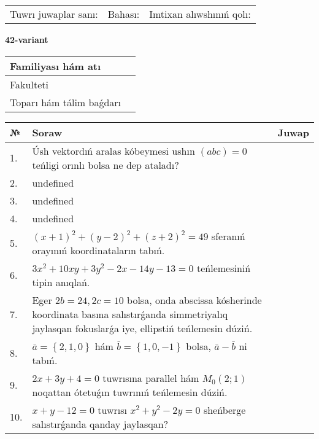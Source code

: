 \documentclass{article}
\begin{document}
\vspace{0.7cm}

\begin{tabular}{lll}
Tuwrı juwaplar sanı: \underline{\hspace{1cm}} & 
Bahası: \underline{\hspace{1cm}} & 
Imtixan alıwshınıń qolı: \underline{\hspace{2cm}} \\
\end{tabular}

\egroup

\newpage


\textbf{42-variant}\\

\bgroup
\def\arraystretch{1.6} %

\begin{tabular}{|m{5.7cm}|m{9.5cm}|}
\hline
Familiyası hám atı & \\
\hline
Fakulteti  & \\
\hline
Toparı hám tálim baǵdarı  & \\
\hline
\end{tabular}

\vspace{0.7cm}

\begin{tabular}{|m{0.7cm}|m{10cm}|m{4cm}|}
\hline
№ & Soraw & Juwap \\
\hline
1. & Úsh vektordıń aralas kóbeymesi ushın \((abc) = 0\) teńligi orınlı bolsa ne dep ataladı? &  \\
\hline
2. & undefined &  \\
\hline
3. & undefined &  \\
\hline
4. & undefined &  \\
\hline
5. & \((x + 1) ^{2} + (y - 2) ^{2} + (z + 2) ^{2} = 49\) sferanıń orayınıń koordinataların tabıń. &  \\
\hline
6. & \(3 x^{2} + 10 xy + 3 y^{2} - 2 x - 14 y - 13 = 0\) teńlemesiniń tipin anıqlań. &  \\
\hline
7. & Eger \(2 b = 24, 2 c = 10\) bolsa, onda abscissa kósherinde koordinata basına salıstırǵanda simmetriyalıq jaylasqan fokuslarǵa iye, ellipstiń teńlemesin dúziń. &  \\
\hline
8. & \(\bar{a} = \left\{ 2, 1, 0 \right\}\) hám \(\bar{b} = \left\{ 1, 0,- 1 \right\}\) bolsa, \(\bar{a} - \bar{b}\) ni tabıń. &  \\
\hline
9. & \(2 x + 3 y + 4 = 0\) tuwrısına parallel hám \(M_{0} (2;1)\) noqattan ótetuǵın tuwrınıń teńlemesin dúziń. &  \\
\hline
10. & \(x + y - 12 = 0\) tuwrısı \(x^{2} + y^{2} - 2 y = 0\) sheńberge salıstırǵanda qanday jaylasqan? & \\
\hline
\end{tabular}
\end{document}
